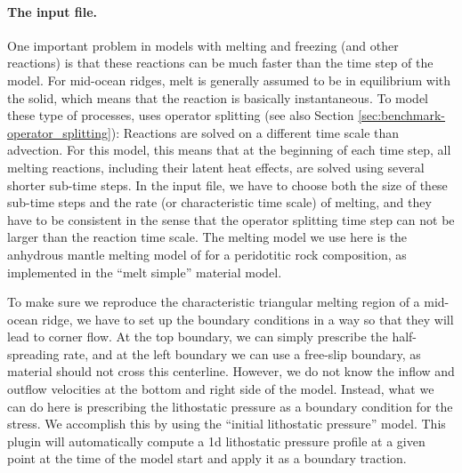 \paragraph{The input file.}
One important problem in models with melting and freezing (and other reactions) is that these reactions
can be much faster than the time step of the model. For mid-ocean ridges, melt is generally assumed to
be in equilibrium with the solid, which means that the reaction is basically instantaneous.
To model these type of processes, \aspect{} uses operator splitting (see also Section \ref{sec:benchmark-operator_splitting}): Reactions are solved on a different time scale than advection.
For this model, this means that at the beginning of each time step, all melting reactions,
including their latent heat effects, are solved using several shorter sub-time steps. In the input file,
we have to choose both the size of these sub-time steps and the rate (or characteristic time scale) of melting,
and they have to be consistent in the sense that the operator splitting time step can not be larger than
the reaction time scale.
The melting model we use here is the anhydrous mantle melting model of \cite{KSL2003} for a peridotitic
rock composition, as implemented in the ``melt simple'' material model.



To make sure we reproduce the characteristic triangular melting region of a mid-ocean ridge, we have to
set up the boundary conditions in a way so that they will lead to corner flow. At the top boundary, we can
simply prescribe the half-spreading rate, and at the left boundary we can use a free-slip boundary, as
material should not cross this centerline. However, we do not know the inflow and outflow velocities at
the bottom and right side of the model. Instead, what we can do here is prescribing the lithostatic
pressure as a boundary condition for the stress. We accomplish this by using the
``initial lithostatic pressure'' model. This plugin will automatically compute a 1d lithostatic pressure
profile at a given point at the time of the model start and apply it as a boundary traction.



